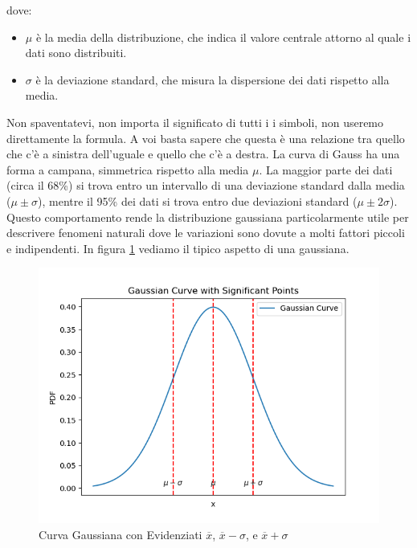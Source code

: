 \documentclass[a4paper,12pt]{article}
\begin{document}
dove:
\begin{itemize}
    \item $\mu$ è la media della distribuzione, che indica il valore centrale attorno al quale i dati sono distribuiti.
    \item $\sigma$ è la deviazione standard, che misura la dispersione dei dati rispetto alla media.
\end{itemize}
Non spaventatevi, non importa il significato di tutti i i simboli, non useremo direttamente la formula. A voi basta sapere che questa è una relazione tra quello che c'è a sinistra dell'uguale e quello che c'è a destra.  
La curva di Gauss ha una forma a campana, simmetrica rispetto alla media $\mu$. La maggior parte dei dati (circa il 68\%) si trova entro un intervallo di una deviazione standard dalla media ($\mu \pm \sigma$), mentre il 95\% dei dati si trova entro due deviazioni standard ($\mu \pm 2\sigma$). Questo comportamento rende la distribuzione gaussiana particolarmente utile per descrivere fenomeni naturali dove le variazioni sono dovute a molti fattori piccoli e indipendenti. In figura \ref{fig:curva_gaussiana} vediamo il tipico aspetto di una gaussiana.

\begin{figure}[h!]
    \centering
     \includegraphics[scale=0.7]{curva_gaussiana.png} 
    \caption{Curva Gaussiana con Evidenziati \(\overline{x}\), \(\overline{x} - \sigma\), e \(\overline{x} + \sigma\)}
    \label{fig:curva_gaussiana}
\end{figure}
\end{document}
